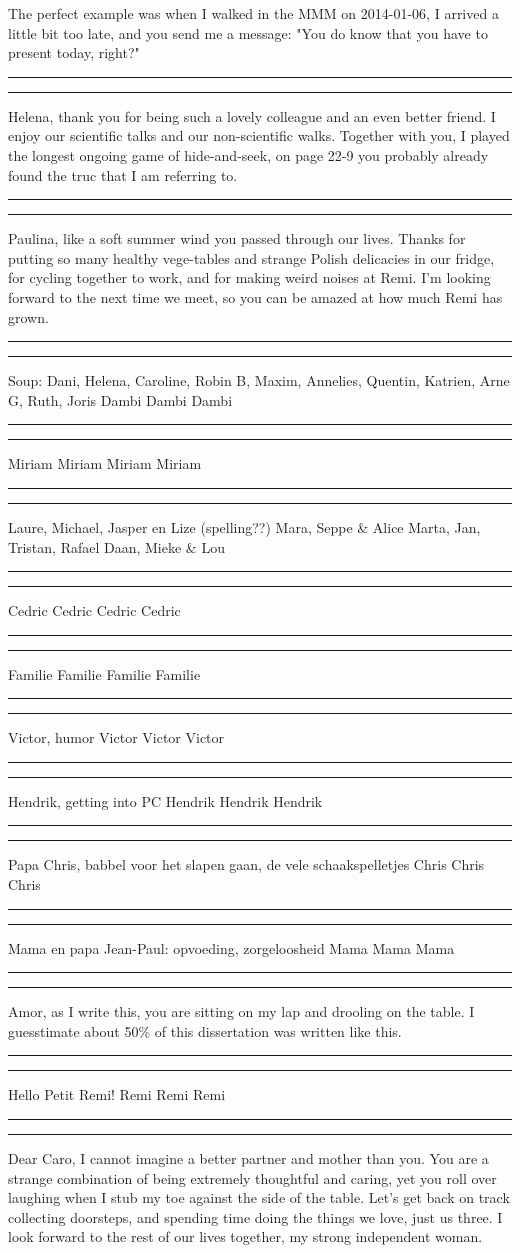 The perfect example was when I walked in the MMM on 2014-01-06,
I arrived a little bit too late, and you send me a message:
"You do know that you have to present today, right?"
\rule{10cm}{0.4pt}
\rule{10cm}{0.4pt}
Helena, thank you for being such a lovely colleague and an even better friend.
I enjoy our scientific talks and our non-scientific walks. 
Together with you, I played the longest ongoing game of hide-and-seek,
on page 22-9 you probably already found the truc that I am referring to.
\rule{10cm}{0.4pt}
\rule{10cm}{0.4pt}
Paulina, like a soft summer wind you passed through our lives.
Thanks for putting so many healthy vege-tables and strange Polish delicacies in our fridge,
for cycling together to work, and for making weird noises at Remi.
I'm looking forward to the next time we meet, so you can be amazed at how much Remi has grown.
\rule{10cm}{0.4pt}
\rule{10cm}{0.4pt}
Soup: Dani, Helena, Caroline, Robin B, Maxim, Annelies, Quentin, Katrien, Arne G, Ruth, Joris
Dambi
Dambi
Dambi
\rule{10cm}{0.4pt}
\rule{10cm}{0.4pt}
Miriam
Miriam
Miriam
Miriam
\rule{10cm}{0.4pt}
\rule{10cm}{0.4pt}
Laure, Michael, Jasper en Lize (spelling??)
Mara, Seppe \& Alice
Marta, Jan, Tristan, Rafael
Daan, Mieke \& Lou
\rule{10cm}{0.4pt}
\rule{10cm}{0.4pt}
Cedric
Cedric
Cedric
Cedric
\rule{10cm}{0.4pt}
\rule{10cm}{0.4pt}
Familie
Familie
Familie
Familie
\rule{10cm}{0.4pt}
\rule{10cm}{0.4pt}
Victor, humor
Victor
Victor
Victor
\rule{10cm}{0.4pt}
\rule{10cm}{0.4pt}
Hendrik, getting into PC
Hendrik 
Hendrik
Hendrik
\rule{10cm}{0.4pt}
\rule{10cm}{0.4pt}
Papa Chris, babbel voor het slapen gaan, de vele schaakspelletjes
Chris
Chris
Chris
\rule{10cm}{0.4pt}
\rule{10cm}{0.4pt}
Mama en papa Jean-Paul: opvoeding, zorgeloosheid
Mama
Mama
Mama
\rule{10cm}{0.4pt}
\rule{10cm}{0.4pt}
Amor, as I write this, you are sitting on my lap and drooling on the table.
I guesstimate about 50\% of this dissertation was written like this.
\rule{10cm}{0.4pt}
\rule{10cm}{0.4pt}
Hello Petit Remi! 
Remi
Remi
Remi
\rule{10cm}{0.4pt}
\rule{10cm}{0.4pt}
Dear Caro,
I cannot imagine a better partner and mother than you.
You are a strange combination of being extremely thoughtful and caring,
yet you roll over laughing when I stub my toe against the side of the table.
Let's get back on track collecting doorsteps,
and spending time doing the things we love, just us three.
I look forward to the rest of our lives together,
my strong independent woman.








